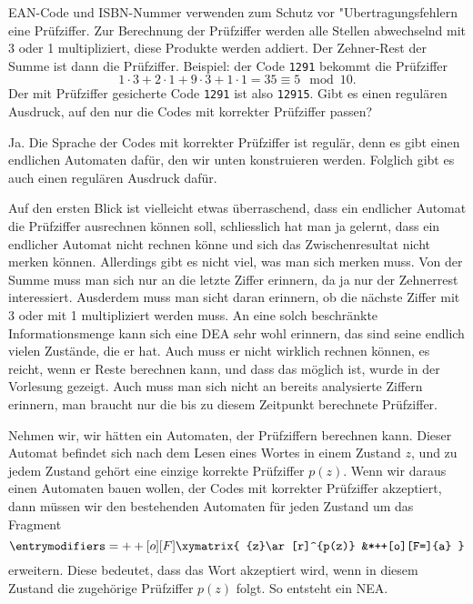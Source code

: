 EAN-Code und ISBN-Nummer verwenden zum Schutz vor "Ubertragungsfehlern
eine Prüfziffer. Zur Berechnung der Prüfziffer werden alle
Stellen abwechselnd mit 3 oder 1 multipliziert, diese Produkte werden
addiert. Der Zehner-Rest der Summe ist dann die Prüfziffer.
Beispiel: der Code {\tt 1291} bekommt die Prüfziffer
\[
1\cdot 3+2\cdot1+9\cdot3+1\cdot 1=35\equiv 5\mod10.
\]
Der mit Prüfziffer gesicherte Code {\tt 1291} ist also {\tt 12915}.
Gibt es einen regulären Ausdruck, auf den nur die Codes mit korrekter
Prüfziffer passen?


\begin{loesung}
Ja. Die Sprache der Codes mit korrekter Prüfziffer ist regulär,
denn es gibt einen endlichen Automaten dafür, den wir unten konstruieren
werden. Folglich gibt es auch einen regulären Ausdruck dafür.

Auf den ersten Blick ist vielleicht etwas überraschend, dass
ein endlicher Automat die Prüfziffer ausrechnen können soll,
schliesslich hat man ja gelernt, dass ein endlicher Automat
nicht rechnen könne und sich das Zwischenresultat nicht merken
können. Allerdings gibt es nicht viel, was man sich merken
muss. Von der Summe muss man sich nur an die letzte Ziffer
erinnern, da ja nur der Zehnerrest interessiert. Ausderdem
muss man sicht daran erinnern, ob die nächste Ziffer mit
3 oder mit 1 multipliziert werden muss. An eine solch beschränkte
Informationsmenge kann sich eine DEA sehr wohl erinnern, das sind
seine endlich vielen Zustände, die er hat. Auch muss er nicht
wirklich rechnen können, es reicht, wenn er Reste berechnen
kann, und dass das möglich ist, wurde in der Vorlesung gezeigt.
Auch muss man sich nicht an bereits analysierte Ziffern erinnern,
man braucht nur die bis zu diesem Zeitpunkt berechnete Prüfziffer.

Nehmen wir, wir hätten ein Automaten, der Prüfziffern
berechnen kann. Dieser Automat befindet sich nach dem Lesen eines
Wortes in einem Zustand $z$, und zu jedem Zustand gehört eine
einzige korrekte Prüfziffer $p(z)$. Wenn wir daraus einen
Automaten bauen wollen, der Codes mit korrekter Prüfziffer
akzeptiert, dann müssen wir den bestehenden Automaten für
jeden Zustand um das Fragment
\[
\entrymodifiers={++[o][F]}
\xymatrix{
{z}\ar[r]^{p(z)}
        &*++[o][F=]{a}
}
\]
erweitern.
Diese bedeutet, dass das Wort akzeptiert wird, wenn in diesem
Zustand die zugehörige Prüfziffer $p(z)$ folgt. So entsteht
ein NEA.


\end{loesung}

